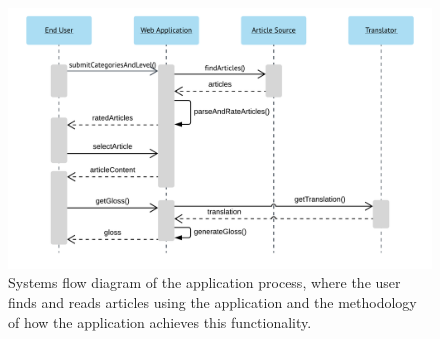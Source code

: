 \begin{figure}[H]
	\caption[Systems Flow Diagram of the Application]{Systems flow diagram of the application process, where the user finds and reads articles using the application and the methodology of how the application achieves this functionality.}
	\label{fig:sf}
	\begin{center}
	\includegraphics[width=\textwidth]{Graphics/SystemsFlowNew}
\end{center}
\end{figure}